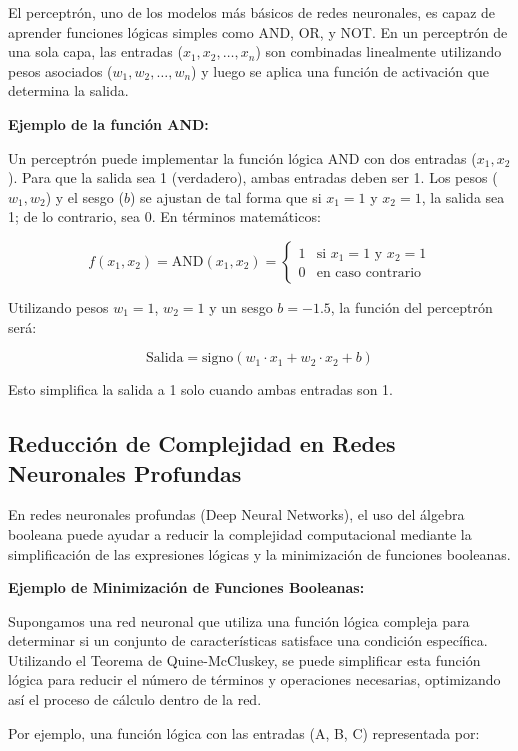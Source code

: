 \documentclass{article}
\begin{document}
\begin{multicols}{2}
El perceptrón, uno de los modelos más básicos de redes neuronales, es capaz 
de aprender funciones lógicas simples como AND, OR, y NOT. En un perceptrón 
de una sola capa, las entradas (\(x_1, x_2, \ldots, x_n\)) son combinadas linealmente 
utilizando pesos asociados (\(w_1, w_2, \ldots, w_n\)) y luego se aplica una función 
de activación que determina la salida.

\textbf{Ejemplo de la función AND:}

Un perceptrón puede implementar la función lógica AND con dos entradas (\(x_1, x_2\)). 
Para que la salida sea 1 (verdadero), ambas entradas deben ser 1. Los pesos (\(w_1, w_2\)) 
y el sesgo (\(b\)) se ajustan de tal forma que si \(x_1 = 1\) y \(x_2 = 1\), la salida sea 
1; de lo contrario, sea 0. En términos matemáticos:

\[
f(x_1, x_2) = \text{AND}(x_1, x_2) = 
\begin{cases} 
1 & \text{si } x_1 = 1 \text{ y } x_2 = 1 \\
0 & \text{en caso contrario}
\end{cases}
\]

Utilizando pesos \(w_1 = 1\), \(w_2 = 1\) y un sesgo \(b = -1.5\), la función del perceptrón será:

\[
\text{Salida} = \text{signo}(w_1 \cdot x_1 + w_2 \cdot x_2 + b)
\]

Esto simplifica la salida a 1 solo cuando ambas entradas son 1.

\subsection{Reducción de Complejidad en Redes Neuronales Profundas}

En redes neuronales profundas (Deep Neural Networks), el uso del álgebra booleana puede 
ayudar a reducir la complejidad computacional mediante la simplificación de las expresiones 
lógicas y la minimización de funciones booleanas.

\textbf{Ejemplo de Minimización de Funciones Booleanas:}

Supongamos una red neuronal que utiliza una función lógica compleja para determinar si 
un conjunto de características satisface una condición específica. Utilizando el Teorema 
de Quine-McCluskey, se puede simplificar esta función lógica para reducir el número de 
términos y operaciones necesarias, optimizando así el proceso de cálculo dentro de la red.

Por ejemplo, una función lógica con las entradas (A, B, C) representada por:


\end{multicols}
\end{document}
